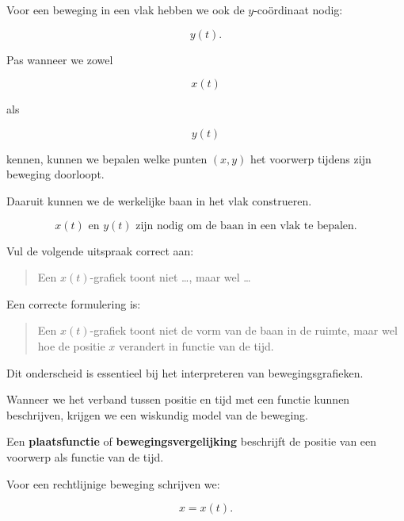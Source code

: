 \documentclass{ximera}
\begin{document}
\begin{oefening}{\oefU\ESS}
\begin{question}
\begin{oplossing}
  Voor een beweging in een vlak hebben we ook de $y$-coördinaat nodig:
  
  \[
  y(t).
  \]
  
  Pas wanneer we zowel
  
  \[
  x(t)
  \]
  
  als
  
  \[
  y(t)
  \]
  
  kennen, kunnen we bepalen welke punten $(x,y)$ het voorwerp tijdens zijn
  beweging doorloopt.
  
  Daaruit kunnen we de werkelijke baan in het vlak construeren.
  
  \[
  \boxed{
  x(t)\text{ en }y(t)\text{ zijn nodig om de baan in een vlak te bepalen.}
  }
  \]
  \end{oplossing}
  \end{question}
  
  
  \begin{question}
  Vul de volgende uitspraak correct aan:
  
  \begin{quote}
  Een $x(t)$-grafiek toont niet \ldots, maar wel \ldots
  \end{quote}
  
  \begin{oplossing}
  Een correcte formulering is:
  
  \begin{quote}
  Een $x(t)$-grafiek toont niet de vorm van de baan in de ruimte,
  maar wel hoe de positie $x$ verandert in functie van de tijd.
  \end{quote}
  
  Dit onderscheid is essentieel bij het interpreteren van
  bewegingsgrafieken.
  \end{oplossing}
  \end{question}
  
  \end{oefening}




Wanneer we het verband tussen positie en tijd met een functie kunnen
beschrijven, krijgen we een wiskundig model van de beweging.

\begin{definitie}[Plaatsfunctie]

Een \textbf{plaatsfunctie} of \textbf{bewegingsvergelijking}
beschrijft de positie van een voorwerp als functie van de tijd.

Voor een rechtlijnige beweging schrijven we:

\[
\boxed{x=x(t).}
\]

\end{definitie}
\end{document}
